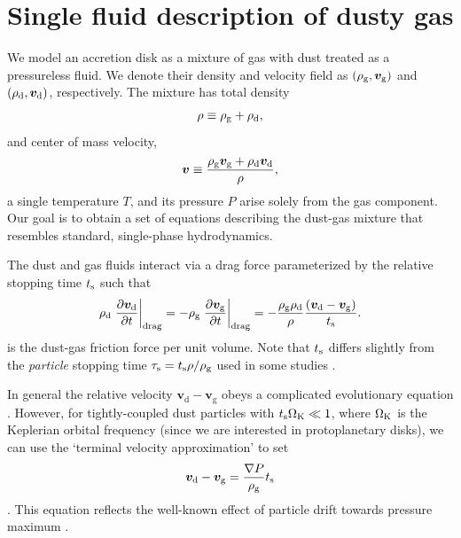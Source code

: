 \section{Single fluid description of dusty gas}\label{setup} 
We model an accretion disk as a mixture of gas with dust treated as a 
pressureless fluid. We denote their density and
velocity field as $(\rho_\mathrm{g},\bm{v}_\mathrm{g})$ and
$(\rho_\mathrm{d},\bm{v}_\mathrm{d})$, respectively. The 
mixture has total density \begin{align}
  \rho \equiv \rho_\mathrm{g} + \rho_\mathrm{d},
\end{align}
and center of mass velocity, 
\begin{align}
  \bm{v} \equiv \frac{\rho_\mathrm{g}\bm{v}_\mathrm{g} + 
    \rho_\mathrm{d}\bm{v}_\mathrm{d}}{\rho}, 
\end{align}
a single temperature $T$, and its pressure $P$ arise solely from the  
gas component. Our goal is to obtain a set of equations
describing the dust-gas mixture that resembles standard, single-phase
hydrodynamics. 


The dust and gas fluids interact via a drag force parameterized by the relative stopping 
time $t_\mathrm{s}$ such that 
\begin{align}  
  \rho_\mathrm{d}\left.\frac{\partial \bm{v}_\mathrm{d}}{\partial t}\right|_\mathrm{drag}= -
  \rho_\mathrm{g}\left.\frac{\partial \bm{v}_\mathrm{g}}{\partial t}\right|_\mathrm{drag}=
  - \frac{\rho_\mathrm{g}\rho_\mathrm{d}}{\rho}\frac{\left(\bm{v}_\mathrm{d} - \bm{v}_\mathrm{g}\right)}{t_\mathrm{s}}. 
\end{align}
is the dust-gas friction force per unit volume. %
 Note that $t_\mathrm{s}$ 
differs slightly from the \emph{particle} stopping time $\tau_\mathrm{s} =
t_\mathrm{s}\rho/\rho_\mathrm{g}$ used in some studies
\citep[e.g.][]{youdin05a}. 

In general the relative velocity $\bm{v}_\mathrm{d} -
\bm{v}_\mathrm{g}$ obeys a complicated evolutionary equation 
\citep[see, e.g.][]{youdin05a}. %
 However, for tightly-coupled dust
particles with $t_\mathrm{s}\Omega_{\rm K}\ll 1 $, where $\Omega_{\rm K}$ is the Keplerian orbital
frequency (since we are interested in protoplanetary disks), we can use the 
`terminal velocity approximation' to set %
\begin{align}
  \bm{v}_\mathrm{d} - \bm{v}_\mathrm{g} = \frac{\nabla
    P}{\rho_\mathrm{g}}t_\mathrm{s}\label{term_vel_approx} 
\end{align}
\citep{jacquet11}. This equation reflects the well-known effect of 
particle drift towards pressure maximum  \citep{weidenschilling77}. 

